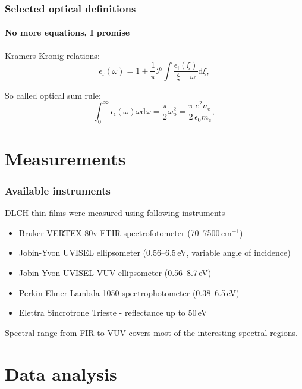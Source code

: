 \documentclass{beamer}
\begin{document}
\begin{frame}
    \frametitle{Selected optical definitions}
    \framesubtitle{No more equations, I promise}

Kramers-Kronig relations:
\begin{equation}
\epsilon_\mathrm{r}(\omega) = 1 + \frac{1}{\pi} \mathcal{P} \int \frac{\epsilon_\mathrm{i}(\xi)}{\xi - \omega} \mathrm{d}\xi \mathrm{,}
\label{KKint}
\end{equation}

So called optical sum rule:
\begin{equation}
\int_0^\infty \epsilon_\mathrm{i} (\omega) \omega \mathrm{d} \omega = \frac{\pi}{2} \omega_\mathrm{p}^2 = \frac{\pi}{2} \frac{e^2 n_\mathrm{e}}{ \epsilon_0 m_\mathrm{e}} \mathrm{,}
\end{equation}

\end{frame}

\section{Measurements}

\begin{frame}
   \frametitle{Available instruments}
   DLCH thin films were measured using following instruments
	\begin{itemize}
	\item Bruker VERTEX 80v FTIR spectrofotometer (70--7500\,cm$^{-1}$)
	\item Jobin-Yvon UVISEL ellipsometer (0.56--6.5\,eV, variable angle of incidence)
	\item Jobin-Yvon UVISEL VUV ellipsometer (0.56--8.7\,eV)
	\item Perkin Elmer Lambda 1050 spectrophotometer (0.38--6.5\,eV)
	\item Elettra Sincrotrone Trieste - reflectance up to 50\,eV
	\end{itemize}
   Spectral range from FIR to VUV covers most of the interesting spectral regions.
\end{frame}

\section{Data analysis}
\end{document}
